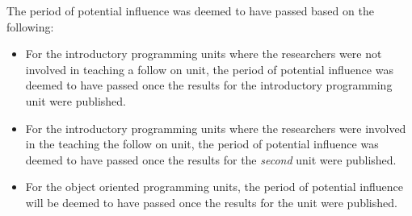
The period of potential influence was deemed to have passed based on the following:
\begin{itemize}[noitemsep,nolistsep]
	\item For the introductory programming units where the researchers were not involved in teaching a follow on unit, the period of potential influence was deemed to have passed once the results for the introductory programming unit were published.
	\item For the introductory programming units where the researchers were involved in the teaching the follow on unit, the period of potential influence was deemed to have passed once the results for the \emph{second} unit were published.
	\item For the object oriented programming units, the period of potential influence will be deemed to have passed once the results for the unit were published.
\end{itemize}

